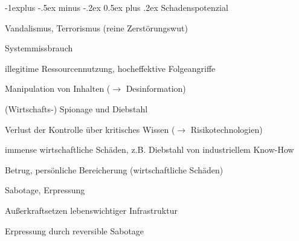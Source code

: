 \documentclass[a4paper]{article}
\makeatletter
\renewcommand{\subsection}{\@startsection{subsection}{2}{0mm}%
 {-1explus -.5ex minus -.2ex}%
 {0.5ex plus .2ex}%
 {\normalfont\normalsize\bfseries}}
\makeatother
\begin{document}
\begin{multicols}{3}
    \subsection{Schadenspotenzial}
    \begin{enumerate*}
        \item Vandalismus, Terrorismus (reine Zerstörungswut)
        \item Systemmissbrauch
        \begin{itemize*}
            \item illegitime Ressourcennutzung, hocheffektive Folgeangriffe
            \item Manipulation von Inhalten ($\rightarrow$ Desinformation)
        \end{itemize*}
        \item (Wirtschafts-) Spionage und Diebstahl
        \begin{itemize*}
            \item Verlust der Kontrolle über kritisches Wissen ($\rightarrow$ Risikotechnologien)
            \item immense wirtschaftliche Schäden, z.B. Diebstahl von industriellem Know-How
        \end{itemize*}
        \item Betrug, persönliche Bereicherung (wirtschaftliche Schäden)
        \item Sabotage, Erpressung
        \begin{itemize*}
            \item Außerkraftsetzen lebenswichtiger Infrastruktur
            \item Erpressung durch reversible Sabotage
        \end{itemize*}
    \end{enumerate*}


\end{multicols}
\end{document}
